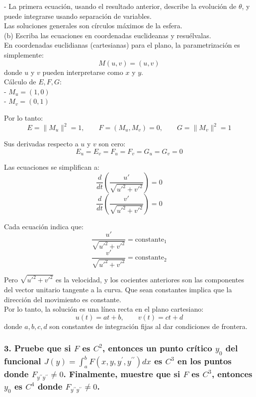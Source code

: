 \documentclass{article}
\theoremstyle{nonumberplain}
\begin{document}
- La primera ecuación, usando el resultado anterior, describe la evolución de \(\theta\), y puede integrarse usando separación de variables. \\

Las soluciones generales son círculos máximos de la esfera. \\

(b) Escriba las ecuaciones en coordenadas euclideanas y resuélvalas. \\

En coordenadas euclidianas (cartesianas) para el plano, la parametrización es simplemente:
\[
M(u, v) = (u, v)
\]
donde \(u\) y \(v\) pueden interpretarse como \(x\) y \(y\). \\

Cálculo de \(E, F, G\):\\

- \( M_u = (1, 0) \) \\
- \( M_v = (0, 1) \)

Por lo tanto:
\[
E = \|M_u\|^2 = 1, \qquad F = (M_u, M_v) = 0, \qquad G = \|M_v\|^2 = 1
\]

Sus derivadas respecto a \(u\) y \(v\) son cero:
\[
E_u = E_v = F_u = F_v = G_u = G_v = 0
\]

Las ecuaciones se simplifican a:
\[
\frac{d}{dt}\left(\frac{u'}{\sqrt{u'^2 + v'^2}}\right) = 0
\]
\[
\frac{d}{dt}\left(\frac{v'}{\sqrt{u'^2 + v'^2}}\right) = 0
\]

Cada ecuación indica que:
\[
\frac{u'}{\sqrt{u'^2 + v'^2}} = \text{constante}_1
\]
\[
\frac{v'}{\sqrt{u'^2 + v'^2}} = \text{constante}_2
\]

Pero \(\sqrt{u'^2 + v'^2}\) es la velocidad, y los cocientes anteriores son las componentes del vector unitario tangente a la curva. Que sean constantes implica que la dirección del movimiento es constante. \\

Por lo tanto, la solución es una línea recta en el plano cartesiano:
\[
u(t) = a t + b,\qquad v(t) = c t + d
\]
donde \(a, b, c, d\) son constantes de integración fijas al dar condiciones de frontera. \\

\subsubsection*{3. Pruebe que si \( F \) es \( C^{2} \), entonces un punto crítico \( y_{0} \) del funcional \( J(y)=\int_{a}^{b} F\left(x, y, y^{\prime}, y^{\prime \prime}\right) d x \) es \( C^{3} \) en los puntos donde \( F_{y^{\prime \prime} y^{\prime \prime}} \neq 0 \). Finalmente, muestre que si \( F \) es \( C^{3} \), entonces \( y_{0} \) es \( C^{4} \) donde \( F_{y^{\prime \prime} y^{\prime \prime}} \neq 0 \).}
\end{document}
